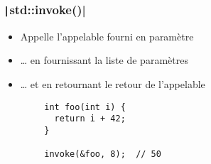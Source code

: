 \documentclass[C++.tex]{subfiles}
\begin{document}
\begin{frame}[fragile]
	\frametitle{\texttt|std::invoke()|}
	\begin{itemize}
		\item Appelle l'appelable fourni en paramètre
		\item \ldots{} en fournissant la liste de paramètres
		\item \ldots{} et en retournant le retour de l'appelable
	\end{itemize}

	\begin{verbatim}
		int foo(int i) {
		  return i + 42;
		}

		invoke(&foo, 8);  // 50
	\end{verbatim}


\end{frame}
\end{document}
